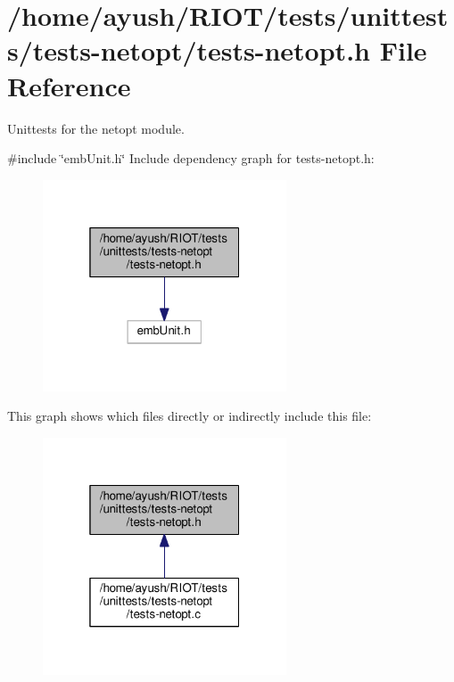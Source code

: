 \hypertarget{tests-netopt_8h}{}\section{/home/ayush/\+R\+I\+O\+T/tests/unittests/tests-\/netopt/tests-\/netopt.h File Reference}
\label{tests-netopt_8h}


Unittests for the {\ttfamily netopt} module.  


{\ttfamily \#include \char`\"{}emb\+Unit.\+h\char`\"{}}\newline
Include dependency graph for tests-\/netopt.h\+:
\nopagebreak
\begin{figure}[H]
\begin{center}
\leavevmode
\includegraphics[width=205pt]{tests-netopt_8h__incl}
\end{center}
\end{figure}
This graph shows which files directly or indirectly include this file\+:
\nopagebreak
\begin{figure}[H]
\begin{center}
\leavevmode
\includegraphics[width=205pt]{tests-netopt_8h__dep__incl}
\end{center}
\end{figure}
